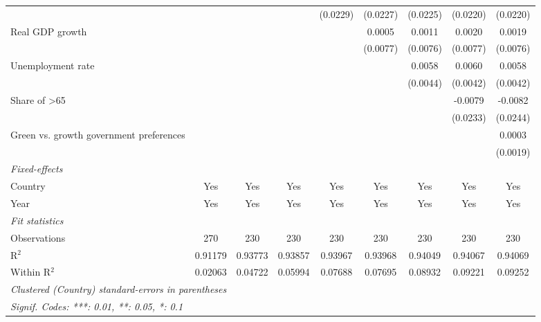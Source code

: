 \begin{table}[htbp]
\begin{tabular}{lcccccccc}
                                              &                &                &          & (0.0229) & (0.0227) & (0.0225) & (0.0220) & (0.0220)\\   
      Real GDP growth                         &                &                &          &          & 0.0005   & 0.0011   & 0.0020   & 0.0019\\   
                                              &                &                &          &          & (0.0077) & (0.0076) & (0.0077) & (0.0076)\\   
      Unemployment rate                       &                &                &          &          &          & 0.0058   & 0.0060   & 0.0058\\   
                                              &                &                &          &          &          & (0.0044) & (0.0042) & (0.0042)\\   
      Share of >65                            &                &                &          &          &          &          & -0.0079  & -0.0082\\   
                                              &                &                &          &          &          &          & (0.0233) & (0.0244)\\   
      Green vs. growth government preferences &                &                &          &          &          &          &          & 0.0003\\   
                                              &                &                &          &          &          &          &          & (0.0019)\\   
      \midrule
      \emph{Fixed-effects}\\
      Country                                 & Yes            & Yes            & Yes      & Yes      & Yes      & Yes      & Yes      & Yes\\  
      Year                                    & Yes            & Yes            & Yes      & Yes      & Yes      & Yes      & Yes      & Yes\\  
      \midrule
      \emph{Fit statistics}\\
      Observations                            & 270            & 230            & 230      & 230      & 230      & 230      & 230      & 230\\  
      R$^2$                                   & 0.91179        & 0.93773        & 0.93857  & 0.93967  & 0.93968  & 0.94049  & 0.94067  & 0.94069\\  
      Within R$^2$                            & 0.02063        & 0.04722        & 0.05994  & 0.07688  & 0.07695  & 0.08932  & 0.09221  & 0.09252\\  
      \midrule \midrule
      \multicolumn{9}{l}{\emph{Clustered (Country) standard-errors in parentheses}}\\
      \multicolumn{9}{l}{\emph{Signif. Codes: ***: 0.01, **: 0.05, *: 0.1}}\\
   \end{tabular}
\end{table}


